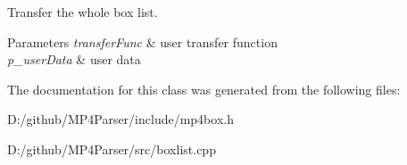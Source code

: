 Transfer the whole box list. 


\begin{DoxyParams}{Parameters}
{\em transfer\+Func} & user transfer function \\
\hline
{\em p\+\_\+user\+Data} & user data \\
\hline
\end{DoxyParams}


The documentation for this class was generated from the following files\+:\begin{DoxyCompactItemize}
\item 
D\+:/github/\+M\+P4\+Parser/include/mp4box.\+h\item 
D\+:/github/\+M\+P4\+Parser/src/boxlist.\+cpp\end{DoxyCompactItemize}

